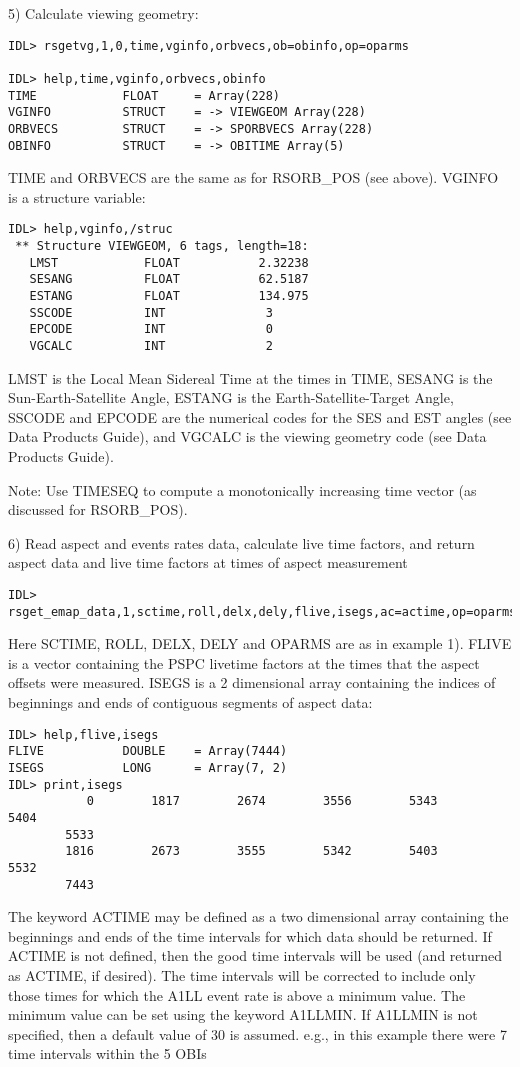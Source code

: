 5) Calculate viewing geometry:

\medskip\noindent
\begin{verbatim}
IDL> rsgetvg,1,0,time,vginfo,orbvecs,ob=obinfo,op=oparms
 
IDL> help,time,vginfo,orbvecs,obinfo
TIME            FLOAT     = Array(228)
VGINFO          STRUCT    = -> VIEWGEOM Array(228)
ORBVECS         STRUCT    = -> SPORBVECS Array(228)
OBINFO          STRUCT    = -> OBITIME Array(5)
\end{verbatim}
TIME and ORBVECS are the same as for RSORB{\_}POS (see above). VGINFO is a
structure variable:

\medskip\noindent
\begin{verbatim}
IDL> help,vginfo,/struc
 ** Structure VIEWGEOM, 6 tags, length=18:
   LMST            FLOAT           2.32238
   SESANG          FLOAT           62.5187
   ESTANG          FLOAT           134.975
   SSCODE          INT              3
   EPCODE          INT              0
   VGCALC          INT              2
\end{verbatim}
LMST is the Local Mean Sidereal Time at the times in TIME, SESANG is the
Sun-Earth-Satellite Angle, ESTANG is the Earth-Satellite-Target Angle, SSCODE
and EPCODE are the numerical codes for the SES and EST angles (see Data
Products Guide), and VGCALC is the viewing geometry code (see Data Products
Guide).
 
Note: Use TIMESEQ to compute a monotonically increasing time vector (as
discussed for RSORB{\_}POS).
 
6) Read aspect and events rates data, calculate live time factors, and
   return aspect data and live time factors at times of aspect measurement

\medskip\noindent
\begin{verbatim}
IDL> rsget_emap_data,1,sctime,roll,delx,dely,flive,isegs,ac=actime,op=oparms
\end{verbatim}
Here SCTIME, ROLL, DELX, DELY and OPARMS are as in example 1). FLIVE is a
vector containing the PSPC livetime factors at the times that the aspect
offsets were measured. ISEGS is a 2 dimensional array containing the
indices of beginnings and ends of contiguous segments of aspect data:

\medskip\noindent
\begin{verbatim}
IDL> help,flive,isegs
FLIVE           DOUBLE    = Array(7444)
ISEGS           LONG      = Array(7, 2)
IDL> print,isegs
           0        1817        2674        3556        5343        5404
        5533
        1816        2673        3555        5342        5403        5532
        7443
\end{verbatim}
The keyword ACTIME may be defined as a two dimensional array containing the
beginnings and ends of the time intervals for which data should be
returned. If ACTIME is not defined, then the good time intervals will be
used (and returned as ACTIME, if desired). The time intervals will be
corrected to include only those times for which the A1LL event rate is
above a minimum value. The minimum value can be set using the keyword
A1LLMIN. If A1LLMIN is not specified, then a default value of 30 is
assumed. e.g., in this example there were 7 time intervals within the 5
OBIs

